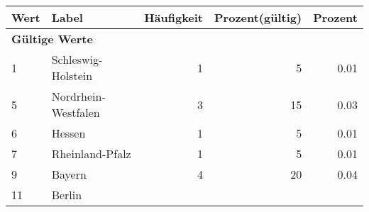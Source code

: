      \begin{longtable}{lXrrr}
     \toprule
     \textbf{Wert} & \textbf{Label} & \textbf{Häufigkeit} & \textbf{Prozent(gültig)} & \textbf{Prozent} \\
     \endhead
     \midrule
     \multicolumn{5}{l}{\textbf{Gültige Werte}}\\

     1 &
     \multicolumn{1}{X}{ Schleswig-Holstein   } &


       \num{1} &
       \num[round-mode=places,round-precision=2]{5} &
         \num[round-mode=places,round-precision=2]{0.01} \\

     5 &
     \multicolumn{1}{X}{ Nordrhein-Westfalen   } &


       \num{3} &
       \num[round-mode=places,round-precision=2]{15} &
         \num[round-mode=places,round-precision=2]{0.03} \\

     6 &
     \multicolumn{1}{X}{ Hessen   } &


       \num{1} &
       \num[round-mode=places,round-precision=2]{5} &
         \num[round-mode=places,round-precision=2]{0.01} \\

     7 &
     \multicolumn{1}{X}{ Rheinland-Pfalz   } &


       \num{1} &
       \num[round-mode=places,round-precision=2]{5} &
         \num[round-mode=places,round-precision=2]{0.01} \\

     9 &
     \multicolumn{1}{X}{ Bayern   } &


       \num{4} &
       \num[round-mode=places,round-precision=2]{20} &
         \num[round-mode=places,round-precision=2]{0.04} \\

     11 &
     \multicolumn{1}{X}{ Berlin   } &



\end{longtable}

